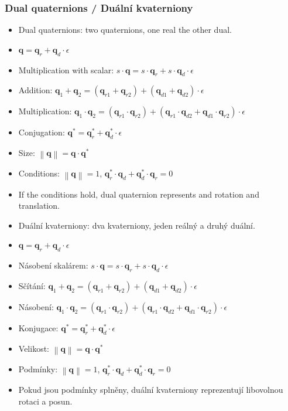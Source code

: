 \begin{frame}\frametitle{Dual quaternions / Duální kvaterniony}\scriptsize
	\begin{itemize}
  \item Dual quaternions: two quaternions, one real the other dual.
  \item $\mathbf{q} = \mathbf{q}_r + \mathbf{q}_d \cdot \epsilon$
  \item Multiplication with scalar: $s \cdot \mathbf{q} = s \cdot \mathbf{q}_r + s \cdot \mathbf{q}_d \cdot \epsilon$
  \item Addition: $\mathbf{q}_1 + \mathbf{q}_2  = (\mathbf{q}_{r1}+\mathbf{q}_{r2}) + (\mathbf{q}_{d1} + \mathbf{q}_{d2}) \cdot \epsilon$
  \item Multiplication: $\mathbf{q}_1 \cdot \mathbf{q}_2  = (\mathbf{q}_{r1} \cdot \mathbf{q}_{r2}) + (\mathbf{q}_{r1} \cdot \mathbf{q}_{d2} + \mathbf{q}_{d1} \cdot \mathbf{q}_{r2} ) \cdot \epsilon$
  \item Conjugation: $\mathbf{q^*} = \mathbf{q}_{r}^* + \mathbf{q}_{d}^* \cdot \epsilon$
  \item Size: $\left\lVert \mathbf{q} \right\rVert = \mathbf{q} \cdot \mathbf{q}^*$
  \item Conditions: $\left\lVert \mathbf{q} \right\rVert = 1$, $\mathbf{q}_r^* \cdot \mathbf{q}_d + \mathbf{q}_d^* \cdot \mathbf{q}_r = 0$
  \item If the conditions hold, dual quaternion represents and rotation and translation.
	\end{itemize}

	\begin{itemize}
  \item Duální kvaterniony: dva kvaterniony, jeden reálný a druhý duální.
  \item $\mathbf{q} = \mathbf{q}_r + \mathbf{q}_d \cdot \epsilon$
  \item Násobení skalárem: $s \cdot \mathbf{q} = s \cdot \mathbf{q}_r + s \cdot \mathbf{q}_d \cdot \epsilon$
  \item Sčítání: $\mathbf{q}_1 + \mathbf{q}_2  = (\mathbf{q}_{r1}+\mathbf{q}_{r2}) + (\mathbf{q}_{d1} + \mathbf{q}_{d2}) \cdot \epsilon$
  \item Násobení: $\mathbf{q}_1 \cdot \mathbf{q}_2  = (\mathbf{q}_{r1} \cdot \mathbf{q}_{r2}) + (\mathbf{q}_{r1} \cdot \mathbf{q}_{d2} + \mathbf{q}_{d1} \cdot \mathbf{q}_{r2} ) \cdot \epsilon$
  \item Konjugace: $\mathbf{q^*} = \mathbf{q}_{r}^* + \mathbf{q}_{d}^* \cdot \epsilon$
  \item Velikost: $\left\lVert \mathbf{q} \right\rVert = \mathbf{q} \cdot \mathbf{q}^*$
  \item Podmínky: $\left\lVert \mathbf{q} \right\rVert = 1$, $\mathbf{q}_r^* \cdot \mathbf{q}_d + \mathbf{q}_d^* \cdot \mathbf{q}_r = 0$
  \item Pokud jsou podmínky splněny, duální kvaterniony reprezentují libovolnou rotaci a posun.
	\end{itemize}
\end{frame}

